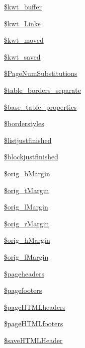 \begin{DoxyCompactItemize}
\hyperlink{classm_p_d_f_ab0cf83bf3f4e9c2cf878ab32fdcf54b2}{\$kwt\-\_\-buffer}
\item 
\hyperlink{classm_p_d_f_aa9c6ede46d025c2092e4efd4b30eb812}{\$kwt\-\_\-\-Links}
\item 
\hyperlink{classm_p_d_f_a887c57fb82e0b24b07cd0e1332e84b7e}{\$kwt\-\_\-moved}
\item 
\hyperlink{classm_p_d_f_a67f445305f7454eb871a201d5c57d222}{\$kwt\-\_\-saved}
\item 
\hyperlink{classm_p_d_f_ac64f6bfa220781f9e59ffe4ad52b9326}{\$\-Page\-Num\-Substitutions}
\item 
\hyperlink{classm_p_d_f_a9b56d4f2f60603c2845d063da372b05a}{\$table\-\_\-borders\-\_\-separate}
\item 
\hyperlink{classm_p_d_f_a49fc966545b50243ed2d6dc27a02f009}{\$base\-\_\-table\-\_\-properties}
\item 
\hyperlink{classm_p_d_f_a5c70b71dc75970c8481141a9d3f25048}{\$borderstyles}
\item 
\hyperlink{classm_p_d_f_aace253794f7fb731575d8ad0b694775d}{\$listjustfinished}
\item 
\hyperlink{classm_p_d_f_a0d538b74c8bb54c8ad1194fbfa8b88a8}{\$blockjustfinished}
\item 
\hyperlink{classm_p_d_f_a2e908dbc80a64e5171b7b9d4f236c4c6}{\$orig\-\_\-b\-Margin}
\item 
\hyperlink{classm_p_d_f_af07a76cd1872f5d2f8d941958a4664d7}{\$orig\-\_\-t\-Margin}
\item 
\hyperlink{classm_p_d_f_a1bcd5c7634c2e0f22f157c4c95a7f260}{\$orig\-\_\-l\-Margin}
\item 
\hyperlink{classm_p_d_f_aba236807a7c76ea95da813e834a868ae}{\$orig\-\_\-r\-Margin}
\item 
\hyperlink{classm_p_d_f_ab6db5737d6640df2ed8f81d626c3f3fc}{\$orig\-\_\-h\-Margin}
\item 
\hyperlink{classm_p_d_f_aa23dee3611c49dd27d5d7fe84614fb28}{\$orig\-\_\-f\-Margin}
\item 
\hyperlink{classm_p_d_f_a118be39bf3d1612c5432d8e6069b0a8a}{\$pageheaders}
\item 
\hyperlink{classm_p_d_f_a9bddc60676030be400c5d66f1caf4ca4}{\$pagefooters}
\item 
\hyperlink{classm_p_d_f_a709b4a05d67c6acf98fae2f5b10cbddc}{\$page\-H\-T\-M\-Lheaders}
\item 
\hyperlink{classm_p_d_f_a5e7367783b78c7f55ecaf38135058c30}{\$page\-H\-T\-M\-Lfooters}
\item 
\hyperlink{classm_p_d_f_a676a62f59341d6bcf742bec055738023}{\$save\-H\-T\-M\-L\-Header}

\end{DoxyCompactItemize}
